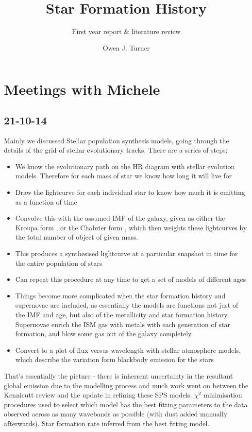 \documentclass{literature}
\title{Star Formation History}
\subtitle{First year report \& literature review}
\author{Owen J. Turner}
\begin{document}
\background
\label{background}





\section{Meetings with Michele}\label{meetings}
\subsection{21-10-14}\label{meeting_1}
Mainly we discussed Stellar population synthesis models, going through the details of the grid of stellar evolutionary tracks. There are a series of steps: 
\begin{itemize}
\item We know the evolutionary path on the HR diagram with stellar evolution models. Therefore for each mass of star we know how long it will live for 
\item Draw the lightcurve for each individual star to know how much it is emitting as a function of time 
\item Convolve this with the assumed IMF of the galaxy, given as either the Kroupa form \citep{Kroupa_1993}, or the Chabrier form \citep{Chabrier_2003}, which then weights these lightcurves by the total number of object of given mass. 
\item This produces a synthesised lightcurve at a particular snapshot in time for the entire population of stars 
\item Can repeat this procedure at any time to get a set of models of different ages 
\item Things become more complicated when the star formation history and supernovae are included, as essentially the models are functions not just of the IMF and age, but also of the metallicity and star formation history. Supernovae enrich the ISM gas with metals with each generation of star formation, and blow some gas out of the galaxy completely. 
\item Convert to a plot of flux versus wavelength with stellar atmosphere models, which describe the variation form blackbody emission for the stars   
\end{itemize}
That's essentially the picture - there is inherrent uncertainty in the resultant global emission due to the modelling process and much work went on between the Kennicutt review and the update in refining these SPS models. $\chi ^{2}$ minimisation procedures used to select which model has the best fitting parameters to the data observed across as many wavebands as possible (with dust added manually afterwards). Star formation rate inferred from the best fitting model. \\
\end{document}
